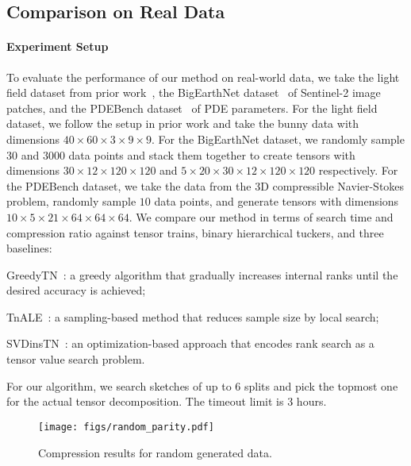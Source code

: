 \subsection{Comparison on Real Data}\label{sec:eval:real}
%
\paragraph{Experiment Setup}
%
To evaluate the performance of our method on real-world data, we take the light field dataset from prior work~\cite{zheng2024svdinstn}, the BigEarthNet dataset~\cite{sumbul2019bigearthnet} of Sentinel-2 image patches, and the PDEBench dataset~\cite{PDEBench,PDEBench2022} of PDE parameters.
%
For the light field dataset, we follow the setup in prior work and take the bunny data with dimensions $40 \times 60 \times 3 \times 9 \times 9$.
%
For the BigEarthNet dataset, we randomly sample $30$ and $3000$ data points and stack them together to create tensors with dimensions $30 \times 12 \times 120 \times 120$ and $5 \times 20 \times 30 \times 12 \times 120 \times 120$ respectively.
%
For the PDEBench dataset, we take the data from the 3D compressible Navier-Stokes problem, randomly sample $10$ data points, and generate tensors with dimensions $10 \times 5 \times 21 \times 64 \times 64 \times 64$.
%
We compare our method in terms of search time and compression ratio against tensor trains, binary hierarchical tuckers, and three baselines:
%
\begin{enumerate*}[label=(\arabic*)]
    \item GreedyTN~\cite{hashemizadeh2020adaptive}: a greedy algorithm that gradually increases internal ranks until the desired accuracy is achieved;
    \item TnALE~\cite{Li_Zeng_Tao_Zhao_2022}: a sampling-based method that reduces sample size by local search;
    \item SVDinsTN~\cite{zheng2024svdinstn}: an optimization-based approach that encodes rank search as a tensor value search problem.
\end{enumerate*}
%
For our algorithm, we search sketches of up to $6$ splits and pick the topmost one for the actual tensor decomposition.
%
The timeout limit is 3 hours.
%
\begin{figure}
    \centering
    \texttt{[image: figs/random\_parity.pdf]}
    \caption{Compression results for random generated data.}
    \label{fig:eval:synthetic}
\end{figure}

